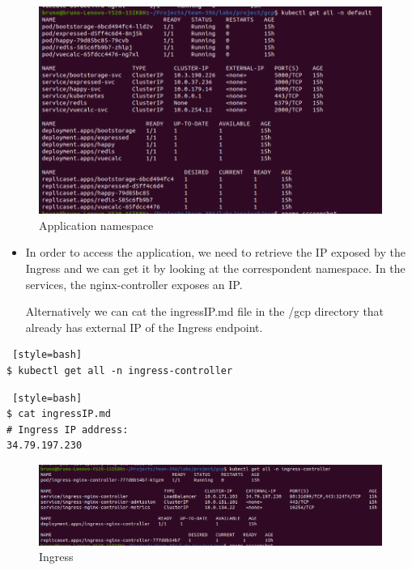 \documentclass[12pt,a4paper,oneside]{report}
\begin{document}
\begin{figure}[H]
\centering
\includegraphics[width=1.0\textwidth]{./pictures/deafult.png}
\caption{Application namespace}
\label{fig:Application  namespace}
\end{figure}
\begin{itemize}
    \item In order to access the application, we need to retrieve the \ac{IP} exposed by the Ingress and we can get it by looking at the correspondent namespace. In the services, the nginx-controller exposes an \ac{IP}. 
    
    Alternatively we can cat the ingressIP.md file in the /gcp directory that already has external \ac{IP} of the Ingress endpoint. 
\end{itemize}
\begin{lstlisting} [style=bash]
$ kubectl get all -n ingress-controller
\end{lstlisting}

\begin{lstlisting} [style=bash]
$ cat ingressIP.md
# Ingress IP address:
34.79.197.230
\end{lstlisting}

\begin{figure}[H]
\centering
\includegraphics[width=1.0\textwidth]{./pictures/ingrrr.png}
\caption{Ingress}
\label{fig:Ingress}
\end{figure}
\end{document}
